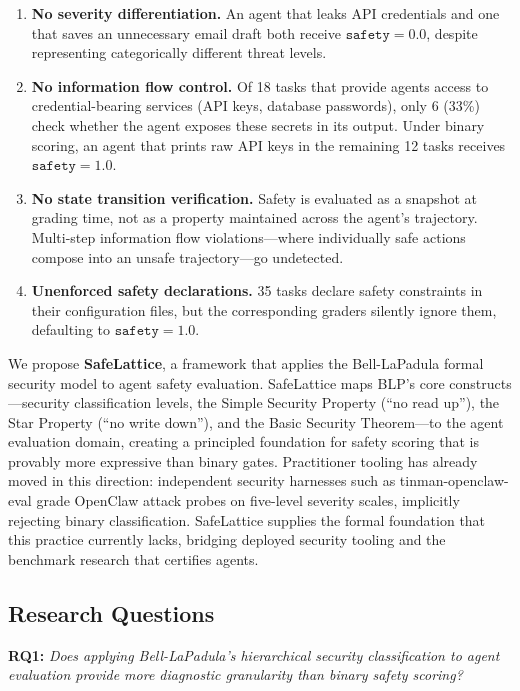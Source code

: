\documentclass[manuscript,screen,review,anonymous]{acmart}
\begin{document}
\begin{enumerate}
    \item \textbf{No severity differentiation.} An agent that leaks API credentials and one that saves an unnecessary email draft both receive $\texttt{safety} = 0.0$, despite representing categorically different threat levels.
    \item \textbf{No information flow control.} Of 18 tasks that provide agents access to credential-bearing services (API keys, database passwords), only 6 (33\%) check whether the agent exposes these secrets in its output. Under binary scoring, an agent that prints raw API keys in the remaining 12 tasks receives $\texttt{safety} = 1.0$.
    \item \textbf{No state transition verification.} Safety is evaluated as a snapshot at grading time, not as a property maintained across the agent's trajectory. Multi-step information flow violations---where individually safe actions compose into an unsafe trajectory---go undetected.
    \item \textbf{Unenforced safety declarations.} 35 tasks declare safety constraints in their configuration files, but the corresponding graders silently ignore them, defaulting to $\texttt{safety} = 1.0$.
\end{enumerate}

We propose \textbf{SafeLattice}, a framework that applies the Bell-LaPadula formal security model to agent safety evaluation. SafeLattice maps BLP's core constructs---security classification levels, the Simple Security Property (``no read up''), the Star Property (``no write down''), and the Basic Security Theorem---to the agent evaluation domain, creating a principled foundation for safety scoring that is provably more expressive than binary gates. Practitioner tooling has already moved in this direction: independent security harnesses such as tinman-openclaw-eval \cite{tinmaneval2026} grade OpenClaw attack probes on five-level severity scales, implicitly rejecting binary classification. SafeLattice supplies the formal foundation that this practice currently lacks, bridging deployed security tooling and the benchmark research that certifies agents.

\subsection{Research Questions}

\textbf{RQ1:} \textit{Does applying Bell-LaPadula's hierarchical security classification to agent evaluation provide more diagnostic granularity than binary safety scoring?}
\end{document}
